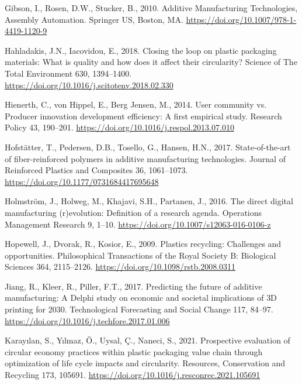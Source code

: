 \documentclass[
  11pt,
]{article}
\newlength{\cslhangindent}
\newlength{\cslentryspacingunit} %
\newenvironment{CSLReferences}[2] %
 {%
  \setlength{\parindent}{0pt}
  \ifodd #1
  \let\oldpar\par
  \def\par{\hangindent=\cslhangindent\oldpar}
  \fi
  \setlength{\parskip}{#2\cslentryspacingunit}
 }%
 {}
\begin{document}
\begin{CSLReferences}{1}{0}
\leavevmode{}%
Gibson, I., Rosen, D.W., Stucker, B., 2010. Additive {Manufacturing
Technologies}, Assembly Automation. {Springer US}, {Boston, MA}.
\url{https://doi.org/10.1007/978-1-4419-1120-9}

\leavevmode{}%
Hahladakis, J.N., Iacovidou, E., 2018. Closing the loop on plastic
packaging materials: {What} is quality and how does it affect their
circularity? Science of The Total Environment 630, 1394--1400.
\url{https://doi.org/10.1016/j.scitotenv.2018.02.330}

\leavevmode{}%
Hienerth, C., von Hippel, E., Berg Jensen, M., 2014. User community vs.
Producer innovation development efficiency: {A} first empirical study.
Research Policy 43, 190--201.
\url{https://doi.org/10.1016/j.respol.2013.07.010}

\leavevmode{}%
Hofstätter, T., Pedersen, D.B., Tosello, G., Hansen, H.N., 2017.
State-of-the-art of fiber-reinforced polymers in additive manufacturing
technologies. Journal of Reinforced Plastics and Composites 36,
1061--1073. \url{https://doi.org/10.1177/0731684417695648}

\leavevmode{}%
Holmström, J., Holweg, M., Khajavi, S.H., Partanen, J., 2016. The direct
digital manufacturing (r)evolution: Definition of a research agenda.
Operations Management Research 9, 1--10.
\url{https://doi.org/10.1007/s12063-016-0106-z}

\leavevmode{}%
Hopewell, J., Dvorak, R., Kosior, E., 2009. Plastics recycling:
Challenges and opportunities. Philosophical Transactions of the Royal
Society B: Biological Sciences 364, 2115--2126.
\url{https://doi.org/10.1098/rstb.2008.0311}

\leavevmode{}%
Jiang, R., Kleer, R., Piller, F.T., 2017. Predicting the future of
additive manufacturing: {A Delphi} study on economic and societal
implications of {3D} printing for 2030. Technological Forecasting and
Social Change 117, 84--97.
\url{https://doi.org/10.1016/j.techfore.2017.01.006}

\leavevmode{}%
Karayılan, S., Yılmaz, Ö., Uysal, Ç., Naneci, S., 2021. Prospective
evaluation of circular economy practices within plastic packaging value
chain through optimization of life cycle impacts and circularity.
Resources, Conservation and Recycling 173, 105691.
\url{https://doi.org/10.1016/j.resconrec.2021.105691}


\end{CSLReferences}
\end{document}
